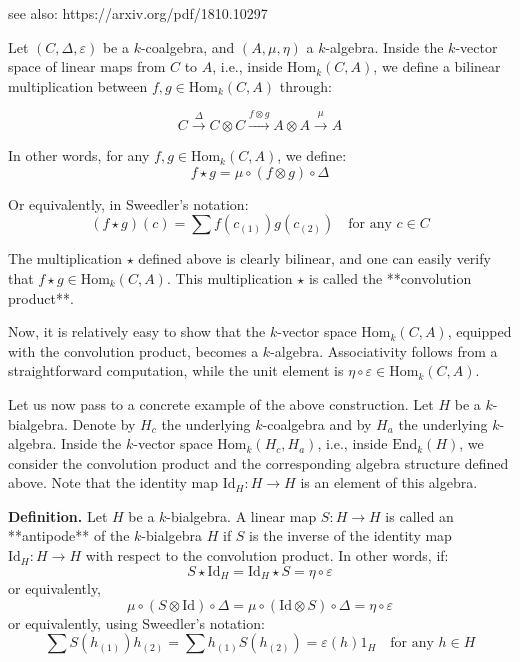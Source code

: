 \documentclass[a4paper,11pt]{report}
\begin{document}
see also: https://arxiv.org/pdf/1810.10297



Let \((C, \Delta, \varepsilon)\) be a \(k\)-coalgebra, and \((A, \mu, \eta)\) a \(k\)-algebra. Inside the \(k\)-vector space of linear maps from \(C\) to \(A\), i.e., inside \(\mathrm{Hom}_k(C, A)\), we define a bilinear multiplication between \(f, g \in \mathrm{Hom}_k(C, A)\) through:

\[
C \xrightarrow{\Delta} C \otimes C \xrightarrow{f \otimes g} A \otimes A \xrightarrow{\mu} A
\]

In other words, for any \(f, g \in \mathrm{Hom}_k(C, A)\), we define:
\[
f \star g = \mu \circ (f \otimes g) \circ \Delta
\]

Or equivalently, in Sweedler's notation:
\[
(f \star g)(c) = \sum f(c_{(1)}) g(c_{(2)})
\quad \text{for any } c \in C
\]

The multiplication \(\star\) defined above is clearly bilinear, and one can easily verify that \(f \star g \in \mathrm{Hom}_k(C, A)\). This multiplication \(\star\) is called the **convolution product**.

Now, it is relatively easy to show that the \(k\)-vector space \(\mathrm{Hom}_k(C, A)\), equipped with the convolution product, becomes a \(k\)-algebra. Associativity follows from a straightforward computation, while the unit element is \(\eta \circ \varepsilon \in \mathrm{Hom}_k(C, A)\).

\bigskip

Let us now pass to a concrete example of the above construction. Let \(H\) be a \(k\)-bialgebra. Denote by \(H_c\) the underlying \(k\)-coalgebra and by \(H_a\) the underlying \(k\)-algebra. Inside the \(k\)-vector space \(\mathrm{Hom}_k(H_c, H_a)\), i.e., inside \(\mathrm{End}_k(H)\), we consider the convolution product and the corresponding algebra structure defined above. Note that the identity map \(\mathrm{Id}_H: H \to H\) is an element of this algebra.

\textbf{Definition.} Let \(H\) be a \(k\)-bialgebra. A linear map \(S: H \to H\) is called an **antipode** of the \(k\)-bialgebra \(H\) if \(S\) is the inverse of the identity map \(\mathrm{Id}_H: H \to H\) with respect to the convolution product. In other words, if:
\[
S \star \mathrm{Id}_H = \mathrm{Id}_H \star S = \eta \circ \varepsilon
\]
or equivalently,
\[
\mu \circ (S \otimes \mathrm{Id}) \circ \Delta = \mu \circ (\mathrm{Id} \otimes S) \circ \Delta = \eta \circ \varepsilon
\]
or equivalently, using Sweedler's notation:
\[
\sum S(h_{(1)}) h_{(2)} = \sum h_{(1)} S(h_{(2)}) = \varepsilon(h) 1_H
\quad \text{for any } h \in H
\]
\end{document}
